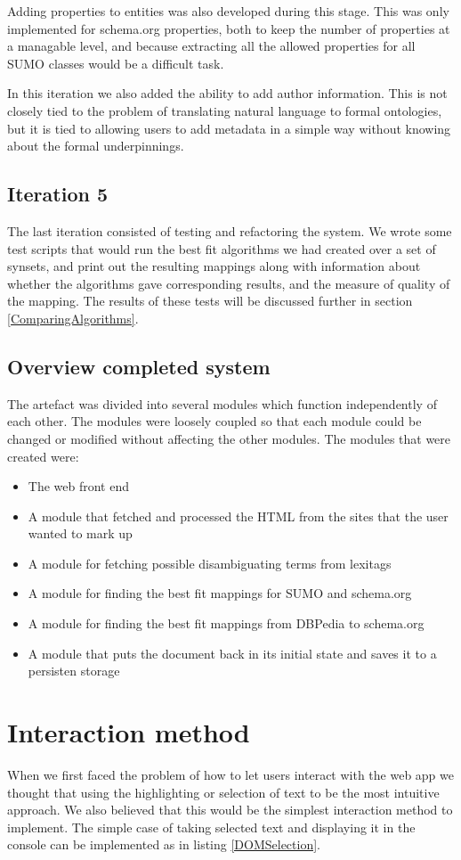 Adding properties to entities was also developed during this stage.
This was only implemented for schema.org properties,
both to keep the number of properties at a managable level,
and because extracting all the allowed properties for all SUMO classes would be a difficult task.

In this iteration we also added the ability to add author information.
This is not closely tied to the problem of translating natural language to formal ontologies,
but it is tied to allowing users to add metadata in a simple way without knowing about the formal underpinnings.

\subsection{Iteration 5}
The last iteration consisted of testing and refactoring the system.
We wrote some test scripts that would run the best fit algorithms we had created over a set of synsets,
and print out the resulting mappings along with information about whether the algorithms gave corresponding results,
and the measure of quality of the mapping.
The results of these tests will be discussed further in section \ref{ComparingAlgorithms}.

\subsection{Overview completed system}
The artefact was divided into several modules which function independently of each other.
The modules were loosely coupled so that each module could be changed or modified without affecting the other modules.
The modules that were created were:
\begin{itemize}
	\item The web front end
	\item A module that fetched and processed the HTML from the sites that the user wanted to mark up
	\item A module for fetching possible disambiguating terms from lexitags
	\item A module for finding the best fit mappings for SUMO and schema.org
	\item A module for finding the best fit mappings from DBPedia to schema.org
	\item A module that puts the document back in its initial state and saves it to a persisten storage
\end{itemize}

\section{Interaction method}
\label{Interaction}
When we first faced the problem of how to let users interact with the web app we thought that using the highlighting or
selection of text to be the most intuitive approach.
We also believed that this would be the simplest interaction method to implement.
The simple case of taking selected text and displaying it in the console can be implemented as in listing \ref{DOMSelection}.

